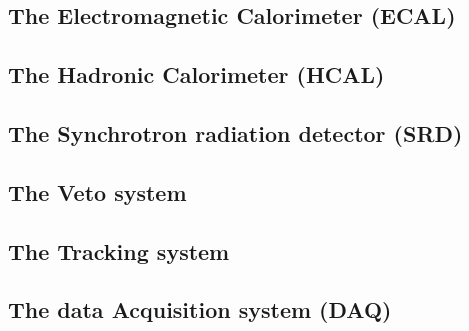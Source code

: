 \subsection{The Electromagnetic Calorimeter (ECAL)}
\label{chapter2:sec:detectors-ecal}

\subsection{The Hadronic Calorimeter (HCAL)}
\label{chapter2:sec:detectors-hcal}

\subsection{The Synchrotron radiation detector (SRD)}
\label{chapter2:sec:detectors-srd}

\subsection{The Veto system}
\label{chapter2:sec:detectors-veto}

\subsection{The Tracking system}
\label{chapter2:sec:detectors-tracking}

\subsection{The data Acquisition system (DAQ)}
\label{chapter2:sec:daq}

